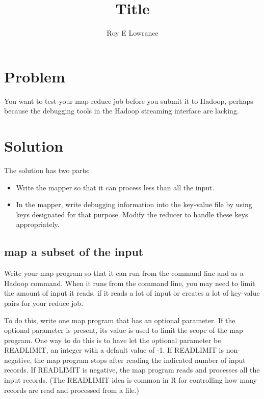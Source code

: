 \documentclass{article}
\begin{document}
\title{Title}
\author{Roy E Lowrance}
\maketitle


\section{Problem}

You want to test your map-reduce job before you submit it to Hadoop, perhaps because the 
debugging tools in the Hadoop streaming interface are lacking.

\section{Solution}

The solution has two parts:
\begin{itemize}
  \item Write the mapper so that it can process less than all the input.
  \item In the mapper, write debugging information into the key-value
    file by using  keys designated for that purpose. Modify the reducer to
    handle these keys appropriately.
\end{itemize}

\subsection{map a subset of the input}

Write your map program so that it can run from the command line and as a
Hadoop command. When it runs from the command line, you may need to
limit the amount of input it reads, if it reads a lot of input or
creates a lot of key-value pairs for your reduce job.

To do this, write one map program that has an optional parameter. If the
optional parameter is present, its value is used to limit the scope of
the map program. One way to do this is to have let the optional
parameter be READLIMIT, an integer with a default value of -1. If
READLIMIT is non-negative, the map program stops after reading the
indicated number of input records. If READLIMIT is negative, the map
program reads and processes all the input records. (The READLIMIT idea
is common in R for controlling how many records are read and processed
from a file.)
\end{document}
